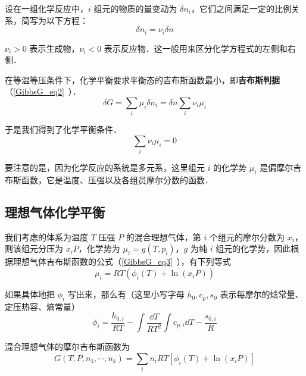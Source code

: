 

设在一组化学反应中，$i$ 组元的物质的量变动为 $\delta n_i$，它们之间满足一定的比例关系，简写为以下方程：
\begin{equation}
\delta n_i=\nu_i \delta n
\end{equation}

$\nu_i>0$ 表示生成物，$\nu_i<0$ 表示反应物．这一般用来区分化学方程式的左侧和右侧．

在等温等压条件下，化学平衡要求平衡态的吉布斯函数最小，即\textbf{吉布斯判据}（\autoref{GibbsG_eq2}~）．
\begin{equation}
\delta G=\sum_i \mu_i\delta n_i=\delta n\sum_i \nu_i\mu_i
\end{equation}

于是我们得到了化学平衡条件．
\begin{equation}\label{ICheEq_eq2}
\sum_i\nu_i\mu_i=0
\end{equation}

要注意的是，因为化学反应的系统是多元系，这里组元 $i$ 的化学势 $\mu_i$ 是偏摩尔吉布斯函数，它是温度、压强以及各组员摩尔分数的函数．

\subsection{理想气体化学平衡}

我们考虑的体系为温度 $T$ 压强 $P$ 的混合理想气体，第 $i$ 个组元的摩尔分数为 $x_i$，则该组元分压为 $x_iP$，化学势为 $\mu_i=g(T,p_i)$，$g$ 为纯 $i$ 组元的化学势，因此根据理想气体吉布斯函数的公式（\autoref{GibbsG_eq3}~），有下列等式
\begin{equation}\label{ICheEq_eq1}
\mu_i=RT(\phi_i(T)+\ln(x_iP))
\end{equation}

如果具体地把 $\phi_i$ 写出来，那么有（这里小写字母 $h_0,c_p,s_0$ 表示每摩尔的焓常量、定压热容、熵常量）
\begin{equation}
\phi_i=\frac{h_{0,i}}{RT}-\int\frac{\dd T}{RT^2}\int c_{p,i}\dd T-\frac{s_{0,i}}{R}
\end{equation}

混合理想气体的摩尔吉布斯函数为
\begin{equation}
G(T,P,n_1,\cdots,n_k)=\sum_i n_iRT[\phi_i(T)+\ln(x_iP)]
\end{equation}

